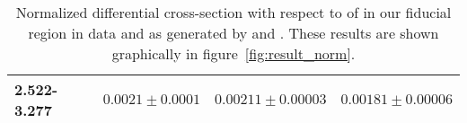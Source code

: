 \begin{table}
\begin{center}
\begin{tabular}{@{}l r r r@{}}
            2.522-3.277  &  $0.0021  \pm  0.0001$  &  $0.00211  \pm  0.00003$  &  $0.00181  \pm  0.00006$  \\
            \bottomrule
        \end{tabular}
    \end{center}
    \caption[
        Normalized differential cross-section with respect to \phistar of
        \Ztoee.
    ]{
        Normalized differential cross-section with respect to \phistar of
        \Ztoee in our fiducial region in data and as generated by \MADGRAPH and
        \POWHEG. These results are shown graphically in
        figure~\ref{fig:result_norm}.
    }
    \label{tab:results_norm}
\end{table}
